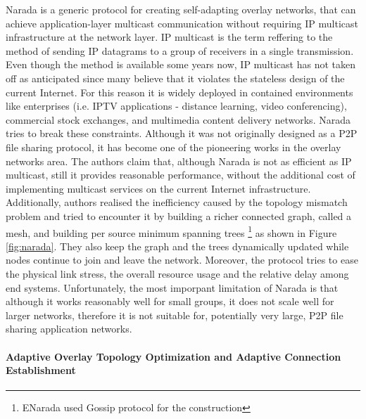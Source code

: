 \documentclass[acmcsur,acmnow]{acmtrans2m}
\begin{document}
Narada \cite{chu_esm_2000,chu_esm_2001,chu_esm_2002} is a generic protocol for creating self-adapting overlay networks, that can achieve application-layer multicast communication without requiring IP multicast infrastructure at the network layer. IP multicast is the term reffering to the method of sending IP datagrams to a group of receivers in a single transmission. Even though the method is available some years now, IP multicast has not taken off as anticipated since many believe that it violates the stateless design of the current Internet. For this reason it is widely deployed in contained environments like enterprises (i.e. IPTV applications - distance learning, video conferencing), commercial stock exchanges, and multimedia content delivery networks. Narada tries to break these constraints. Although it was not originally designed as a P2P file sharing protocol, it has become one of the pioneering works in the overlay networks area. The authors claim that, although Narada is not as efficient as IP multicast, still it provides reasonable performance, without the additional cost of implementing multicast services on the current Internet infrastructure. Additionally, authors realised the inefficiency caused by the topology mismatch problem and tried to encounter it by building a richer connected graph, called a mesh, and building per source minimum spanning trees \footnote{ENarada \cite{li_enarada_2008} used Gossip protocol for the construction} as shown in Figure \ref{fig:narada}. They also keep the
graph and the trees dynamically updated while nodes continue to join and leave the network. Moreover, the protocol tries to ease the physical link stress, the overall resource usage and the relative delay among end systems. Unfortunately, the most imporpant limitation of Narada is that although it works reasonably well for small groups, it does not scale well for larger networks, therefore it is not suitable for, potentially very large, P2P file sharing application networks.

\paragraph*{\bf Adaptive Overlay Topology Optimization and Adaptive Connection
Establishment}
\end{document}
